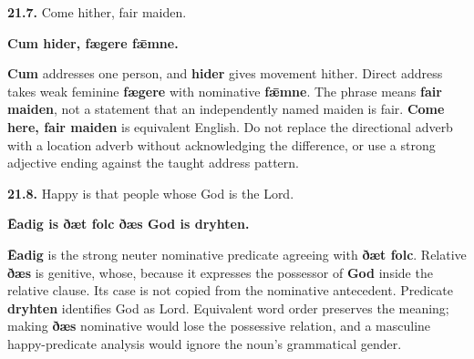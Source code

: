 \par\begin{minipage}{\linewidth}\raggedright
\textbf{21.7.} Come hither, fair maiden.

\textbf{Cum hider, fægere fǣmne.}

\textbf{Cum} addresses one person, and \textbf{hider} gives movement hither. Direct address takes weak feminine \textbf{fægere} with nominative \textbf{fǣmne}. The phrase means \textbf{fair maiden}, not a statement that an independently named maiden is fair. \textbf{Come here, fair maiden} is equivalent English. Do not replace the directional adverb with a location adverb without acknowledging the difference, or use a strong adjective ending against the taught address pattern.

\end{minipage}\par\addvspace{4pt}

\par\begin{minipage}{\linewidth}\raggedright
\textbf{21.8.} Happy is that people whose God is the Lord.

\textbf{Ēadig is ðæt folc ðæs God is dryhten.}

\textbf{Ēadig} is the strong neuter nominative predicate agreeing with \textbf{ðæt folc}. Relative \textbf{ðæs} is genitive, whose, because it expresses the possessor of \textbf{God} inside the relative clause. Its case is not copied from the nominative antecedent. Predicate \textbf{dryhten} identifies God as Lord. Equivalent word order preserves the meaning; making \textbf{ðæs} nominative would lose the possessive relation, and a masculine happy-predicate analysis would ignore the noun's grammatical gender.

\end{minipage}\par\addvspace{4pt}

